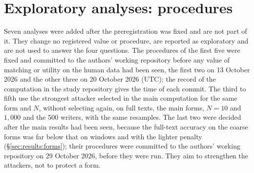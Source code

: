 \section{Exploratory analyses: procedures}
\label{app:exploratory}


Seven analyses were added after the preregistration was fixed and are not part of it. They change no registered value
or procedure, are reported as exploratory and are not used to answer the four questions. The procedures of the first
five were fixed and committed to the authors' working repository before any value of matching or utility on the
human data had been seen, the first two on 13 October 2026 and the other three on 20 October 2026 (UTC); the record of
the computation in the study repository gives the time of each commit. The third to fifth use the strongest
attacker selected in the main computation for the same form and $N$, without selecting again, on full texts, the main
forms, $N = 10$ and $1{,}000$ and the 500 writers, with the same resamples. The last two were decided after the main
results had been seen, because the full-text accuracy on the coarse forms was far below that on windows and with the
lighter penalty (\S\ref{sec:results:forms}); their procedures were committed to the authors' working repository on 29 October 2026, before they were
run. They aim to strengthen the attackers, not to protect a form.


